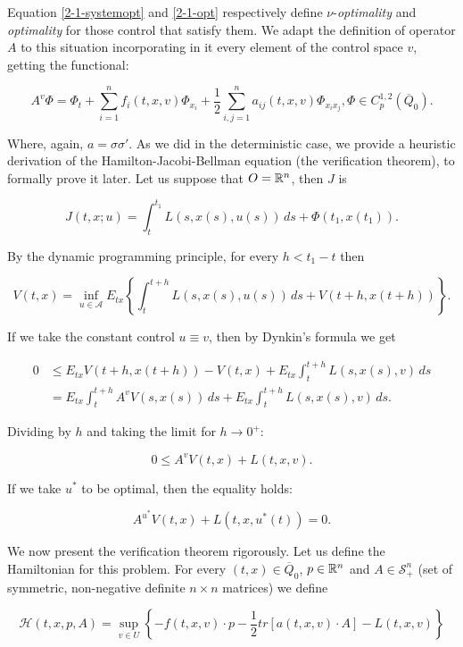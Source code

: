 Equation \eqref{2-1-systemopt} and \eqref{2-1-opt} respectively define $\nu$-\textit{optimality} and \textit{optimality} for those control that 
satisfy them. We adapt the definition of operator $A$ to this situation incorporating in it every element of the control space $v$, getting the functional:

\begin{equation}\label{2-1-defAwithv}
    A^{v}\Phi = \Phi_t + \sum_{i=1}^nf_i(t,x,v)\Phi_{x_i} + \frac{1}{2}\sum_{i,j=1}^n a_{ij}(t,x,v)\Phi_{x_ix_j}, \Phi\in C^{1,2}_p(\overline{Q}_0).
\end{equation}

Where, again, $a=\sigma\sigma'$. As we did in the deterministic case, we provide a heuristic derivation of the Hamilton-Jacobi-Bellman equation (the verification theorem), 
to formally prove it later. Let us suppose that $O=\mathbb{R}^n$, then $J$ is

\begin{equation}
    J(t,x;u) = \int_t^{t_1} L(s,x(s),u(s))\,ds + \Phi(t_1,x(t_1)).
\end{equation}

By the dynamic programming principle, for every $h<t_1-t$ then

\[V(t,x) = \inf_{u\in\mathcal{A}}E_{tx}\left\{\int_t^{t+h} L(s,x(s),u(s))\,ds + V(t+h,x(t+h))\right\}.\]

If we take the constant control $u\equiv v$, then by Dynkin's formula we get

\begin{align*}
    0 & \leq E_{tx}V(t+h,x(t+h))-V(t,x) + E_{tx}\int_t^{t+h} L(s,x(s),v)\,ds \\
    & = E_{tx}\int_t^{t+h} A^vV(s,x(s))\,ds + E_{tx}\int_t^{t+h} L(s,x(s),v)\,ds.
\end{align*}

Dividing by $h$ and taking the limit for $h\to0^+$:

\[0 \leq A^vV(t,x) + L(t,x,v).\]

If we take $u^{\ast}$ to be optimal, then the equality holds:

\[A^{u^{\ast}}V(t,x) + L(t,x,u^{\ast}(t)) = 0.\]

We now present the verification theorem rigorously. Let us define the Hamiltonian for this problem. For every $(t,x)\in\overline{Q}_0$, 
$p\in\mathbb{R}^n$ and $A\in\mathcal{S}_+^n$ (set of symmetric, non-negative definite $n\times n$ matrices) we define

\begin{equation}\label{2-1-defhamilt}
    \mathcal{H}(t,x,p,A) =  \sup_{v\in U}\left\{-f(t,x,v)\cdot p - \frac{1}{2}tr\left[a(t,x,v)\cdot A\right] - L(t,x,v)\right\}
\end{equation}

